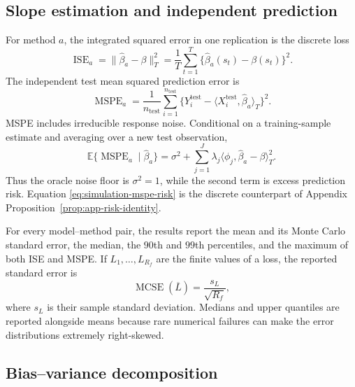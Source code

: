 \subsection{Slope estimation and independent prediction}

For method $a$, the integrated squared error in one replication is the
discrete loss
\begin{equation}
    \operatorname{ISE}_{a}
    =\|\widehat\beta_a-\beta\|_T^2
    =\frac1T\sum_{t=1}^{T}
      \{\widehat\beta_a(s_t)-\beta(s_t)\}^2.
    \label{eq:simulation-ise}
\end{equation}
The independent test mean squared prediction error is
\begin{equation}
    \operatorname{MSPE}_{a}
    =\frac1{n_{\mathrm{test}}}
      \sum_{i=1}^{n_{\mathrm{test}}}
      \{Y_i^{\mathrm{test}}
      -\langle X_i^{\mathrm{test}},\widehat\beta_a\rangle_T\}^2.
    \label{eq:simulation-mspe}
\end{equation}
MSPE includes irreducible response noise.  Conditional on a training-sample
estimate and averaging over a new test observation,
\begin{equation}
    \mathbb E\{\operatorname{MSPE}_{a}\mid\widehat\beta_a\}
    =\sigma^2+
      \sum_{j=1}^{J}\lambda_j
      \langle\phi_j,\widehat\beta_a-\beta\rangle_T^2.
    \label{eq:simulation-mspe-risk}
\end{equation}
Thus the oracle noise floor is $\sigma^2=1$, while the second term is excess
prediction risk.  Equation \eqref{eq:simulation-mspe-risk} is the discrete
counterpart of Appendix Proposition~\ref{prop:app-risk-identity}.

For every model--method pair, the results report the mean and its Monte Carlo
standard error, the median, the $90$th and $99$th percentiles, and the maximum
of both ISE and MSPE.  If $L_1,\ldots,L_{R_f}$ are the finite values of a loss,
the reported standard error is
\begin{equation}
    \operatorname{MCSE}(\overline L)
    =\frac{s_L}{\sqrt{R_f}},
    \label{eq:simulation-mcse}
\end{equation}
where $s_L$ is their sample standard deviation.  Medians and upper quantiles
are reported alongside means because rare numerical failures can make the
error distributions extremely right-skewed.

\subsection{Bias--variance decomposition}

